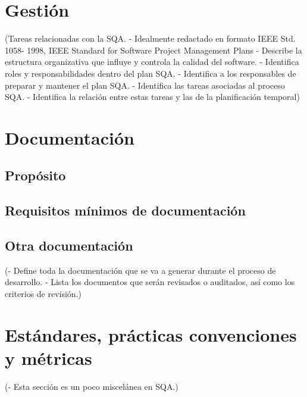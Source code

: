 \documentclass[spanish,a4paper,12pt, twoside]{report}	%
\begin{document}
\newpage
\mbox{}
\thispagestyle{empty}						%
\newpage

\chapter{ Gestión}
	(Tareas relacionadas con la SQA.
	- Idealmente redactado en formato IEEE Std. 1058-
	1998, IEEE Standard for Software Project
	Management Plans
	- Describe la estructura organizativa que influye y
	controla la calidad del software.
	- Identifica roles y responsabilidades dentro del plan
	SQA.
	- Identifica a los responsables de preparar y mantener
	el plan SQA.
	- Identifica las tareas asociadas al proceso SQA.
	- Identifica la relación entre estas tareas y las de la
	planificación temporal)

\newpage
\mbox{}
\thispagestyle{empty}						%
\newpage

\chapter{ Documentación}
	\section{Propósito}
	\section{Requisitos mínimos de documentación}
	\section{Otra documentación}

	(- Define toda la documentación que se va a generar
	durante el proceso de desarrollo.
	- Lista los documentos que serán revisados o
	auditados, así como los criterios de revisión.)

\newpage
\mbox{}
\thispagestyle{empty}						%
\newpage

\chapter{ Estándares, prácticas convenciones y métricas}
	(- Esta sección es un poco miscelánea en SQA.) %

\newpage
\mbox{}
\thispagestyle{empty}						%
\newpage
\end{document}
